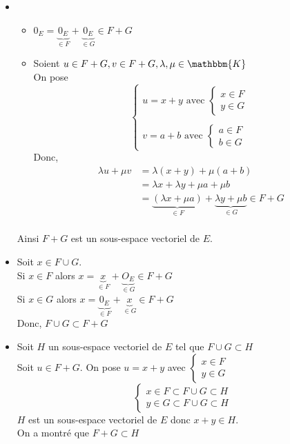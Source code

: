 \begin{prv}
	\begin{itemize}
		\item 
			\begin{itemize}
				\item $0_E = \underbrace{0_E}_{\in F} + \underbrace{0_E}_{\in G} \in F + G$
				\item Soient $u \in F + G, v \in F + G, \lambda,\mu \in \mathbbm{K}$\\
					On pose \[
						\begin{cases}
							u = x+y \text{ avec } \begin{cases}
								x \in F\\
								y \in G
							\end{cases}\\~\\
							v = a+b \text{ avec } \begin{cases}
								a \in F\\
								b \in G
							\end{cases}
						\end{cases}
					\]
					Donc,
					\begin{align*}
						\lambda u + \mu v &= \lambda(x+y) + \mu(a+b)\\
						&= \lambda x + \lambda y + \mu a + \mu b \\
						&= \underbrace{(\lambda x + \mu a)}_{\in F} + \underbrace{\lambda y + \mu b}_{\in G} \in F+G \\
					\end{align*}
			\end{itemize}
			Ainsi $F + G$ est un sous-espace vectoriel de $E$.
		\item Soit $x \in F \cup G$.\\
			Si $x \in F$ alors $x = \underbrace{x}_{\in F} + \underbrace{O_E}_{\in G} \in F+G$ \\
			Si $x \in G$ alors $x = \underbrace{0_E}_{\in F} + \underbrace{x}_{\in G} \in F+G$ \\
			Donc, $F \cup G \subset  F +G$ 
		\item Soit $H$ un sous-espace vectoriel de $E$ tel que $F\cup G \subset  H$ \\
			Soit $u \in F + G$. On pose $u = x + y$ avec $\begin{cases}
				x \in F\\
				y \in G
			\end{cases}$ \\
			\[
				\begin{cases}
					x \in F \subset  F\cup G \subset  H\\
					y \in G \subset  F\cup G \subset H
				\end{cases}
			\] 
			$H$ est un sous-espace vectoriel de $E$ donc $x+y \in H$.\\
			On a montré que $F+G \subset  H$
	\end{itemize}
\end{prv}

